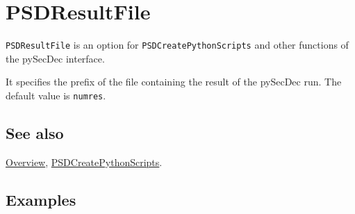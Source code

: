 \documentclass[../FeynHelpersManual.tex]{subfiles}
\begin{document}
\hypertarget{psdresultfile}{
\section{PSDResultFile}\label{psdresultfile}}

\texttt{PSDResultFile} is an option for \texttt{PSDCreatePythonScripts}
and other functions of the pySecDec interface.

It specifies the prefix of the file containing the result of the
pySecDec run. The default value is \texttt{numres}.

\subsection{See also}

\hyperlink{toc}{Overview},
\hyperlink{psdcreatepythonscripts}{PSDCreatePythonScripts}.

\subsection{Examples}
\end{document}

